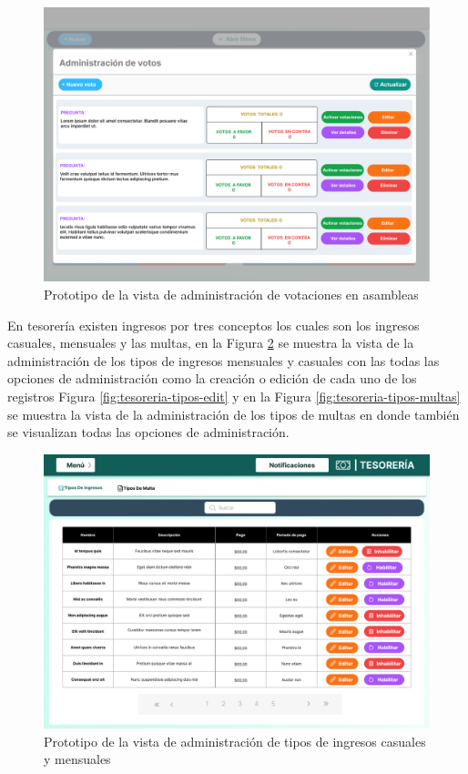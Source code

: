 \begin{figure}[H]
    \centering
    \includegraphics[width=1\textwidth]{resources/images/convocatorias_votaciones}
    \caption{Prototipo de la vista de administración de votaciones en asambleas}
    \label{fig:convocatorias-votaciones}
\end{figure}

En tesorería existen ingresos por tres conceptos los cuales son los ingresos casuales, mensuales y las multas, en la Figura \ref{fig:tesoreria-tipos} se muestra la vista de la administración de los tipos de ingresos mensuales y casuales con las todas las opciones de administración como la creación o edición de cada uno de los registros Figura \ref{fig:tesoreria-tipos-edit} y en la Figura \ref{fig:tesoreria-tipos-multas} se muestra la vista de la administración de los tipos de multas en donde también se visualizan todas las opciones de administración.


\begin{figure}[H]
    \centering
    \includegraphics[width=1\textwidth]{resources/images/tesoreia - tipos}
    \caption{Prototipo de la vista de administración de tipos de ingresos casuales y mensuales}
    \label{fig:tesoreria-tipos}
\end{figure}

